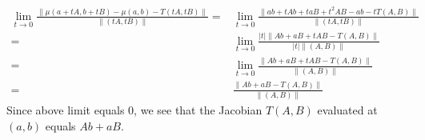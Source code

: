 \documentclass[12pt]{article}
\begin{document}
\begin{enumerate}
\begin{mybox}
    \begin{align*}
        \lim_{t\to 0}
        {\frac{\|\mu(a+tA,b+tB)-\mu(a,b)-T(tA,tB)\|}
        {\|(tA,tB)\|}}
        =&\lim_{t\to 0}
        {\frac{\|ab+tAb+taB+t^2AB-ab-tT(A,B)\|}
        {\|(tA,tB)\|}}\\
        =&\lim_{t\to 0}
        {\frac{|t|\|Ab+aB+tAB-T(A,B)\|}
        {|t|\|(A,B)\|}}\\
        =&\lim_{t\to 0}
        {\frac{\|Ab+aB+tAB-T(A,B)\|}
        {\|(A,B)\|}}\\
        =&\frac{\|Ab+aB-T(A,B)\|}
        {\|(A,B)\|}
    \end{align*}
    Since above limit equals 0, we see that
    the Jacobian
    $T(A,B)$ evaluated at $(a,b)$ equals $Ab+aB$.

\end{mybox}
\end{enumerate}
\end{document}
